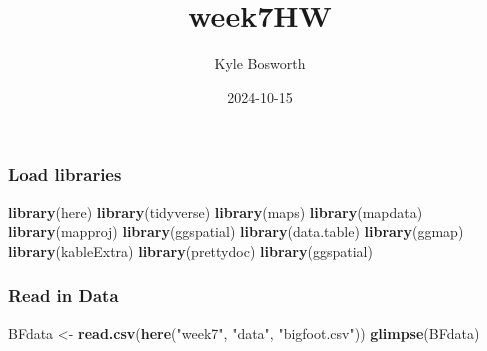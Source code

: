 \documentclass[
]{article}
\title{week7HW}
\author{Kyle Bosworth}
\date{2024-10-15}
\newenvironment{Shaded}{\begin{snugshade}}{\end{snugshade}}
\newcommand{\FunctionTok}[1]{\textcolor[rgb]{0.13,0.29,0.53}{\textbf{#1}}}
\newcommand{\NormalTok}[1]{#1}
\newcommand{\OtherTok}[1]{\textcolor[rgb]{0.56,0.35,0.01}{#1}}
\newcommand{\StringTok}[1]{\textcolor[rgb]{0.31,0.60,0.02}{#1}}
\begin{document}
\maketitle

{
\setcounter{tocdepth}{2}
\tableofcontents
}
\subsubsection{Load libraries}\label{load-libraries}

\begin{Shaded}
\begin{Highlighting}[]
\FunctionTok{library}\NormalTok{(here)}
\FunctionTok{library}\NormalTok{(tidyverse)}
\FunctionTok{library}\NormalTok{(maps)}
\FunctionTok{library}\NormalTok{(mapdata)}
\FunctionTok{library}\NormalTok{(mapproj)}
\FunctionTok{library}\NormalTok{(ggspatial)}
\FunctionTok{library}\NormalTok{(data.table)}
\FunctionTok{library}\NormalTok{(ggmap)}
\FunctionTok{library}\NormalTok{(kableExtra)}
\FunctionTok{library}\NormalTok{(prettydoc)}
\FunctionTok{library}\NormalTok{(ggspatial)}
\end{Highlighting}
\end{Shaded}

\subsubsection{Read in Data}\label{read-in-data}

\begin{Shaded}
\begin{Highlighting}[]
\NormalTok{BFdata }\OtherTok{\textless{}{-}} \FunctionTok{read.csv}\NormalTok{(}\FunctionTok{here}\NormalTok{(}\StringTok{"week7"}\NormalTok{, }\StringTok{"data"}\NormalTok{, }\StringTok{"bigfoot.csv"}\NormalTok{))}
\FunctionTok{glimpse}\NormalTok{(BFdata)}
\end{Highlighting}
\end{Shaded}
\end{document}
